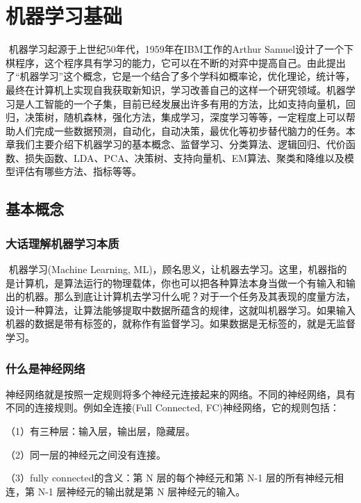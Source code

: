 \chapter{机器学习基础}
\label{ux7b2cux4e8cux7ae0-ux673aux5668ux5b66ux4e60ux57faux7840}
​ 机器学习起源于上世纪50年代，1959年在IBM工作的Arthur
Samuel设计了一个下棋程序，这个程序具有学习的能力，它可以在不断的对弈中提高自己。由此提出了``机器学习''这个概念，它是一个结合了多个学科如概率论，优化理论，统计等，最终在计算机上实现自我获取新知识，学习改善自己的这样一个研究领域。机器学习是人工智能的一个子集，目前已经发展出许多有用的方法，比如支持向量机，回归，决策树，随机森林，强化方法，集成学习，深度学习等等，一定程度上可以帮助人们完成一些数据预测，自动化，自动决策，最优化等初步替代脑力的任务。本章我们主要介绍下机器学习的基本概念、监督学习、分类算法、逻辑回归、代价函数、损失函数、LDA、PCA、决策树、支持向量机、EM算法、聚类和降维以及模型评估有哪些方法、指标等等。

\section{ 基本概念}\label{ux57faux672cux6982ux5ff5}

\subsection{大话理解机器学习本质}\label{ux5927ux8bddux7406ux89e3ux673aux5668ux5b66ux4e60ux672cux8d28}

​ 机器学习(Machine Learning,
ML)，顾名思义，让机器去学习。这里，机器指的是计算机，是算法运行的物理载体，你也可以把各种算法本身当做一个有输入和输出的机器。那么到底让计算机去学习什么呢？对于一个任务及其表现的度量方法，设计一种算法，让算法能够提取中数据所蕴含的规律，这就叫机器学习。如果输入机器的数据是带有标签的，就称作有监督学习。如果数据是无标签的，就是无监督学习。

\subsection{什么是神经网络}\label{ux4ec0ux4e48ux662fux795eux7ecfux7f51ux7edc}

​
神经网络就是按照一定规则将多个神经元连接起来的网络。不同的神经网络，具有不同的连接规则。例如全连接(Full
Connected, FC)神经网络，它的规则包括：

（1）有三种层：输入层，输出层，隐藏层。

（2）同一层的神经元之间没有连接。

（3）fully connected的含义：第 N 层的每个神经元和第 N-1
层的所有神经元相连，第 N-1 层神经元的输出就是第 N 层神经元的输入。

